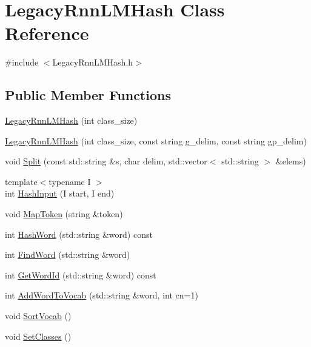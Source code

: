 \hypertarget{class_legacy_rnn_l_m_hash}{}\section{Legacy\+Rnn\+L\+M\+Hash Class Reference}
\label{class_legacy_rnn_l_m_hash}


{\ttfamily \#include $<$Legacy\+Rnn\+L\+M\+Hash.\+h$>$}

\subsection*{Public Member Functions}
\begin{DoxyCompactItemize}
\item 
\hyperlink{class_legacy_rnn_l_m_hash_a95c7d816f90cd7d38b7cb187d6cf2246}{Legacy\+Rnn\+L\+M\+Hash} (int class\+\_\+size)
\item 
\hyperlink{class_legacy_rnn_l_m_hash_a84da4bd0d52cf54a0fd98cdd496c58a3}{Legacy\+Rnn\+L\+M\+Hash} (int class\+\_\+size, const string g\+\_\+delim, const string gp\+\_\+delim)
\item 
void \hyperlink{class_legacy_rnn_l_m_hash_a29b25e1bec4ad47e57e07ac5f47e26f1}{Split} (const std\+::string \&s, char delim, std\+::vector$<$ std\+::string $>$ \&elems)
\item 
{\footnotesize template$<$typename I $>$ }\\int \hyperlink{class_legacy_rnn_l_m_hash_aa59043b40e1d9f6d8d6306d3c08a2814}{Hash\+Input} (I start, I end)
\item 
void \hyperlink{class_legacy_rnn_l_m_hash_a1fd0b060d136c90d6d8e03f82c9e859c}{Map\+Token} (string \&token)
\item 
int \hyperlink{class_legacy_rnn_l_m_hash_a25e420c7afd77b3c372d3362dc9d84af}{Hash\+Word} (std\+::string \&word) const 
\item 
int \hyperlink{class_legacy_rnn_l_m_hash_a038210ebadfce90db9fe7b9822a23dc0}{Find\+Word} (std\+::string \&word)
\item 
int \hyperlink{class_legacy_rnn_l_m_hash_a4bb3449f6fdc2fabdab847dec598dbea}{Get\+Word\+Id} (std\+::string \&word) const 
\item 
int \hyperlink{class_legacy_rnn_l_m_hash_a7a0cdd9aec9322262094fdb82050acf1}{Add\+Word\+To\+Vocab} (std\+::string \&word, int cn=1)
\item 
void \hyperlink{class_legacy_rnn_l_m_hash_ae35b969e55886797b92964154c31c07b}{Sort\+Vocab} ()
\item 
void \hyperlink{class_legacy_rnn_l_m_hash_ad961e5749a0493141a5f24e0712d9174}{Set\+Classes} ()
\end{DoxyCompactItemize}
